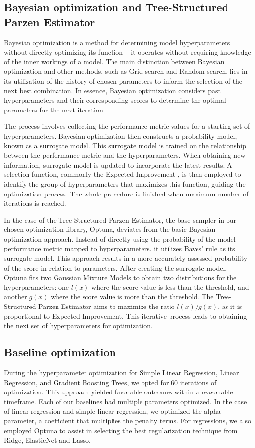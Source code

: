 \subsection{Bayesian optimization and Tree-Structured Parzen Estimator}
Bayesian optimization is a method for determining model hyperparameters without directly optimizing its function -- it operates without requiring knowledge of the inner workings of a model. The main distinction between Bayesian optimization and other methods, such as Grid search and Random search, lies in its utilization of the history of chosen parameters to inform the selection of the next best combination. In essence, Bayesian optimization considers past hyperparameters and their corresponding scores to determine the optimal parameters for the next iteration.

The process involves collecting the performance metric values for a starting set of hyperparameters. Bayesian optimization then constructs a probability model, known as a surrogate model. This surrogate model is trained on the relationship between the performance metric and the hyperparameters. When obtaining new information, surrogate model is updated to incorporate the latest results. A selection function, commonly the Expected Improvement \cite{ament2024unexpected}, is then employed to identify the group of hyperparameters that maximizes this function, guiding the optimization process. The whole procedure is finished when maximum number of iterations is reached.

In the case of the Tree-Structured Parzen Estimator, the base sampler in our chosen optimization library, Optuna, deviates from the basic Bayesian optimization approach. Instead of directly using the probability of the model performance metric mapped to hyperparameters, it utilizes Bayes' rule as its surrogate model. This approach results in a more accurately assessed probability of the score in relation to parameters. After creating the surrogate model, Optuna fits two Gaussian Mixture Models to obtain two distributions for the hyperparameters: one $l(x)$ where the score value is less than the threshold, and another $g(x)$ where the score value is more than the threshold. The Tree-Structured Parzen Estimator aims to maximize the ratio $l(x)/g(x)$, as it is proportional to Expected Improvement. This iterative process leads to obtaining the next set of hyperparameters for optimization.

\subsection{Baseline optimization}
During the hyperparameter optimization for Simple Linear Regression, Linear Regression, and Gradient Boosting Trees, we opted for 60 iterations of optimization. This approach yielded favorable outcomes within a reasonable timeframe. Each of our baselines had multiple parameters optimized. In the case of linear regression and simple linear regression, we optimized the alpha parameter, a coefficient that multiplies the penalty terms. For regressions, we also employed Optuna to assist in selecting the best regularization technique from Ridge, ElasticNet and Lasso.

